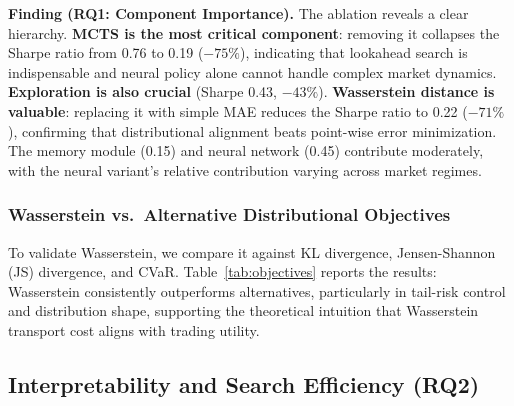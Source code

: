 \documentclass{elektr}
\theoremstyle{corollary}
\theoremstyle{lemma}
\theoremstyle{proposition}
\theoremstyle{axiom}
\theoremstyle{conjecture}
\theoremstyle{example}
\theoremstyle{definition}
\theoremstyle{remark}
\begin{document}
\textbf{Finding (RQ1: Component Importance).} The ablation reveals a clear hierarchy. \textbf{MCTS is the most critical component}: removing it collapses the Sharpe ratio from 0.76 to 0.19 ($-75\%$), indicating that lookahead search is indispensable and neural policy alone cannot handle complex market dynamics. \textbf{Exploration is also crucial} (Sharpe 0.43, $-43\%$). \textbf{Wasserstein distance is valuable}: replacing it with simple MAE reduces the Sharpe ratio to 0.22 ($-71\%$), confirming that distributional alignment beats point-wise error minimization. The memory module (0.15) and neural network (0.45) contribute moderately, with the neural variant's relative contribution varying across market regimes.

\subsubsection{Wasserstein vs.\ Alternative Distributional Objectives}

To validate Wasserstein, we compare it against KL divergence, Jensen-Shannon (JS) divergence, and CVaR. Table~\ref{tab:objectives} reports the results: Wasserstein consistently outperforms alternatives, particularly in tail-risk control and distribution shape, supporting the theoretical intuition that Wasserstein transport cost aligns with trading utility.

\begin{table}[htbp]
\centering
\caption{Performance Comparison Across Distributional Objectives }
\label{tab:objectives}
\end{table}

\subsection{Interpretability and Search Efficiency (RQ2)}
\end{document}
